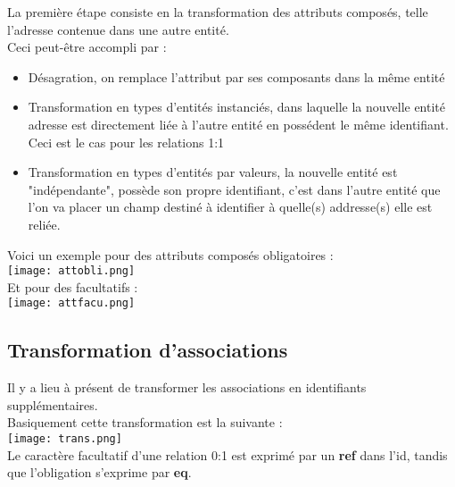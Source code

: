 \documentclass{report}
\begin{document}
			La première étape consiste en la transformation des attributs composés, telle l'adresse contenue dans une autre entité.\\

			Ceci peut-être accompli par : \\

			\begin{itemize}
				\item Désagration, on remplace l'attribut par ses composants dans la même entité
				\item Transformation en types d'entités instanciés, dans laquelle la nouvelle entité adresse est directement liée à l'autre entité en possédent le même identifiant. Ceci est le cas pour les relations 1:1
				\item Transformation en types d'entités par valeurs, la nouvelle entité est "indépendante", possède son propre identifiant, c'est dans l'autre entité que l'on va placer un champ destiné à identifier à quelle(s) addresse(s) elle est reliée.\\
			\end{itemize}

			Voici un exemple pour des attributs composés obligatoires : \\

				\texttt{[image: attobli.png]}\\

			Et pour des facultatifs : \\

				\texttt{[image: attfacu.png]}\\	

		\subsection{Transformation d'associations}

			Il y a lieu à présent de transformer les associations en identifiants supplémentaires.\\

			Basiquement cette transformation est la suivante : \\

			\texttt{[image: trans.png]}\\

			Le caractère facultatif d'une relation 0:1 est exprimé par un \textbf{ref} dans l'id, tandis que l'obligation s'exprime par \textbf{eq}.\\
\end{document}

